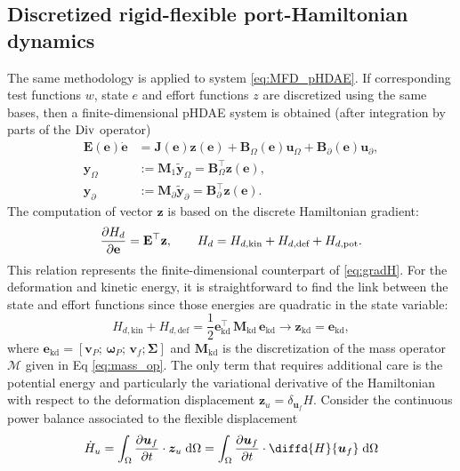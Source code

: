 \subsection{Discretized rigid-flexible port-Hamiltonian dynamics}

The same methodology is applied to system \eqref{eq:MFD_pHDAE}. If corresponding test functions $w$, state $e$ and effort functions $z$ are discretized using the same bases, then a finite-dimensional pHDAE system is obtained (after integration by parts of the ${\operatorname*{Div}}$ operator)
\begin{equation}
\begin{aligned}
\mathbf{E}(\mathbf{e}) \dot{\mathbf{e}} &= \mathbf{J}(\mathbf{e}) \mathbf{z}(\mathbf{e}) + \mathbf{B}_\Omega(\mathbf{e}) \mathbf{u}_\Omega + \mathbf{B}_\partial(\mathbf{e}) \mathbf{u}_\partial, \\
\mathbf{y}_\Omega &:= \mathbf{M}_1 \widetilde{\mathbf{y}}_\Omega = \mathbf{B}_\Omega^\top \mathbf{z}(\mathbf{e}),  \\
\mathbf{y}_\partial &:= \mathbf{M}_\partial \widetilde{\mathbf{y}}_\partial = \mathbf{B}_\partial^\top \mathbf{z}(\mathbf{e}).
\end{aligned}
\end{equation}
The computation of vector $\mathbf{z}$ is based on the discrete Hamiltonian  gradient:
\[
\diffp{H_d}{\mathbf{e}} = \mathbf{E}^\top \mathbf{z}, \qquad H_d = H_{d, \text{kin}}+H_{d, \text{def}}+H_{d, \text{pot}}.
\]
This relation represents the finite-dimensional counterpart of \eqref{eq:gradH}. For the deformation and kinetic energy, it is straightforward to find the link between the state and effort functions since those energies are quadratic in the state variable:
\begin{equation}
H_{d, \text{kin}} + H_{d, \text{def}} = \frac{1}{2} \mathbf{e}_{\text{kd}}^\top \, \mathbf{M}_{\text{kd}} \, \mathbf{e}_{\text{kd}} \longrightarrow \mathbf{z}_{\text{kd}} = \mathbf{e}_{\text{kd}},
\end{equation}
where $\mathbf{e}_{\text{kd}} = [\mathbf{v}_P; \, \bm{\omega}_P; \, \mathbf{v}_f; \bm{\Sigma}]$ and $\mathbf{M}_{\text{kd}}$ is the discretization of the mass operator $\bm{\mathcal{M}}$ given in Eq \eqref{eq:mass_op}.
The only term that requires additional care is the potential energy and particularly the variational derivative of the Hamiltonian with respect to the deformation displacement $\bm{z}_{u}=\delta_{\bm{u}_f} H$.  Consider the continuous power balance associated to the flexible displacement
\[
\dot{H}_u = \int_{\Omega} \diffp{\bm{u}_f}{t} \cdot \bm{z}_{u} \d{\Omega} = \int_{\Omega} \diffp{\bm{u}_f}{t} \cdot \diffd{H}{\bm{u}_f} \d{\Omega}
\]
